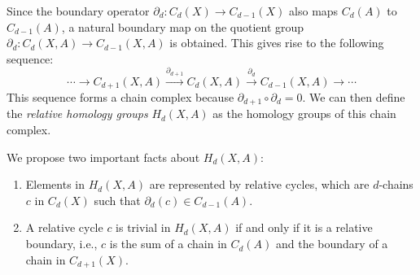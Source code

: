 Since the boundary operator $\partial_d: C_d(X) \rightarrow C_{d-1}(X)$ also maps $C_d(A)$ to $C_{d-1}(A)$, a natural boundary map on the quotient group $\partial_d: C_d(X,A) \rightarrow C_{d-1}(X,A)$ is obtained. This gives rise to the following sequence:
\begin{equation}
\cdots \xrightarrow{} C_{d+1}(X,A) \xrightarrow{\partial_{d+1}} C_d(X,A) \xrightarrow{\partial_d} C_{d-1}(X,A) \xrightarrow{} \cdots
\end{equation}
This sequence forms a chain complex because $\partial_{d+1} \circ \partial_{d} = 0$. We can then define the \emph{relative homology groups} $H_d(X,A)$ as the homology groups of this chain complex.

We propose two important facts about $H_d(X,A)$:

\begin{proposition}
\begin{enumerate}
    \item Elements in $H_d(X,A)$ are represented by relative cycles, which are $d$-chains $c$ in $C_d(X)$ such that $\partial_d(c) \in C_{d-1}(A)$.
    \item A relative cycle $c$ is trivial in $H_d(X,A)$ if and only if it is a relative boundary, i.e., $c$ is the sum of a chain in $C_d(A)$ and the boundary of a chain in $C_{d+1}(X)$.
\end{enumerate}
\end{proposition}

